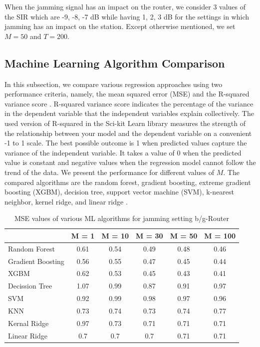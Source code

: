 	When the jamming signal has an impact on the router, we consider 3 values of the SIR which are -9, -8, -7 dB while having 1, 2, 3 dB for the settings in which jamming has an impact on the station. Except otherwise mentioned, we set$M = 50$ and $T = 200$. 
	
    \subsection{Machine Learning Algorithm Comparison}
    In this subsection, we compare various regression approaches using two performance criteria, namely, the mean squared error (MSE) and the R-squared variance score \cite{r-squared}. R-squared variance score indicates the percentage of the variance in the dependent variable that the independent variables explain collectively. The used version of R-squared in the Sci-kit Learn library measures the strength of the relationship between your model and the dependent variable on a convenient -1 to 1 scale. The best possible outcome is 1 when predicted values capture the variance of the independent variable. It takes a value of 0 when the predicted value is constant and negative values when the regression model cannot follow the trend of the data. We present the performance for different values of $M$. The compared algorithms are the random forest, gradient boosting, extreme gradient boosting (XGBM), decision tree, support vector machine (SVM), k-nearest neighbor, kernel ridge, and linear ridge \cite{SCIKITLEARN,Chen:2016:XST:2939672.2939785}. %
    
\begin{table}[htbp]
  \centering
  \caption{MSE values of various ML algorithms for jamming setting b/g-Router}
    \begin{tabular}{|p{5.3em}|c|c|c|c|c|}
    \toprule
          & \multicolumn{1}{p{2.4em}|}{M = 1} & \multicolumn{1}{p{2.9em}|}{M = 10} & \multicolumn{1}{p{2.9em}|}{M = 30} & \multicolumn{1}{p{2.9em}|}{M = 50} & \multicolumn{1}{p{3.4em}|}{M = 100} \\
    \midrule
    Random Forest	 & 0.61  & 0.54  & 0.49  & 0.48  & 0.46 \\
    \midrule
    Gradient Boosting  & 0.56  & 0.55  & 0.47  & 0.45  & 0.44 \\
    \midrule
    XGBM  & 0.62  & 0.53  & 0.45  & 0.43  & 0.41 \\
    \midrule
    Decission Tree & 1.07  & 0.99  & 0.87  & 0.91  & 0.97 \\
    \midrule
    SVM   & 0.92  & 0.99  & 0.98  & 0.97  & 0.96 \\
    \midrule
    KNN   & 0.73  & 0.74  & 0.73  & 0.74  & 0.77 \\
    \midrule
    Kernal Ridge & 0.97  & 0.73  & 0.71  & 0.71  & 0.71 \\
    \midrule
    Linear Ridge & 0.7   & 0.7   & 0.7   & 0.71  & 0.71 \\
    \bottomrule
    \end{tabular}%
  \label{tab:T1}%
\end{table}%

